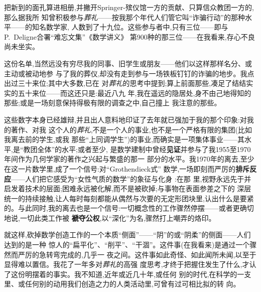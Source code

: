 把新到的面孔算进相册,并撇开Springer-殡仪馆一方的贡献、只算信众教团一方的,那么据我所
知曾积极参与\emph{葬礼}——按我那个年代人们管它叫“诈骗行动”的那种水平——的知名数学家,
人数到了十九位。这些参与者中,只有三位——即与 P.~Deligne合署“难忘文集”《数学讲义》
第900种的那三位——在我看来,存心不良尚未坐实。

这份名单,当然远没有穷尽我的同事、旧学生或朋友——他们以这样那样名分、或主动或被动地参
与了我的葬仪,却没有走到参与一场铁板钉钉的诈骗的地步。我点出过三十来位;其中大多数,已在
对\emph{葬礼}的思考中提到;算上前面那些,凑足了结结实实的五十来位——而这还只是:最近八九
年,我在遥远的隐居处,身不由己地得知的那些;或是一场刻意保持得极有限的调查之中,自己撞上
我注意的那些。

这些数字本身已经雄辩,并且出人意料地印证了去年就已强加于我的那个印象:对我的著作、对我
这个人的\emph{葬礼},不是一个人的事业,也不是一个严格有限的集团(比如我离去前的学生,或我
那些“上同调学生”)的事业,而确实是一项集体事业——其水平,是“教团全体”的水平;或者至少,
是数学建制中曾经\dmark{}\textbf{见证}并参与了我1955至1970年间作为几何学家的著作之兴起与繁盛的那一
部分的水平。我1970年的离去,至少在这一片数学里,成了一个信号:对“Grothendieck式”
数学,一场即刻而严厉的\textbf{排斥反应}——人们把它感受为“女性气质的数学”的象征与化身
:在那
里,视野永远先于并启发着技术的层面;困难永远被化解,而不是被砍掉;与事物在表面参差之下的
深层统一的持续接触,让人每时每刻都能从偶然与次要的无定形团块里,认出什么是要紧的。与此同时,我的离去也是一个信号:一切概念性的工作骤然停摆——或者更确切地说,一切此类工作被
\textbf{褫夺公权},以“深化”为名,骤然打上嘲弄的烙印。

就这样,砍掉数学创造工作的一个本质“侧面”——“阴”的或“阴柔”的侧面——人们达到的是一种
惊人的“扁平化”、“削平”、“干涸”。这件事(在我看来)是通过一个骤然而严厉的急转弯完成的,几乎一
夜之间。这件事如此奇怪、如此闻所未闻,以至于显得难以置信。我花了一年多对\emph{葬礼}的高强
度思考,才终于把握住发生了什么,才认了这份明摆着的事实。我不知道,近年或近几十年,或任何
别的时代,在科学的一支里、或任何别的动用我们创造之力的人类活动里,可曾有过可相比拟的转
向。

